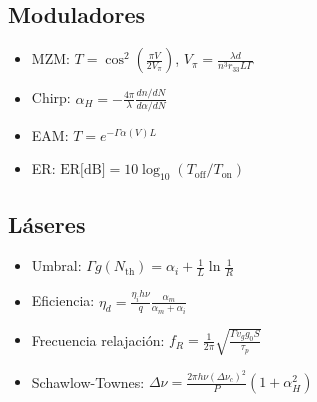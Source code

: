 \documentclass[11pt,a4paper]{article}
\begin{document}
\subsection{Moduladores}

\begin{itemize}
    \item MZM: $T = \cos^2\left(\frac{\pi V}{2V_\pi}\right)$, $V_\pi = \frac{\lambda d}{n^3r_{33}L\Gamma}$
    \item Chirp: $\alpha_H = -\frac{4\pi}{\lambda}\frac{dn/dN}{d\alpha/dN}$
    \item EAM: $T = e^{-\Gamma\alpha(V)L}$
    \item ER: $\text{ER[dB]} = 10\log_{10}(T_{\text{off}}/T_{\text{on}})$
\end{itemize}

\subsection{Láseres}

\begin{itemize}
    \item Umbral: $\Gamma g(N_{\text{th}}) = \alpha_i + \frac{1}{L}\ln\frac{1}{R}$
    \item Eficiencia: $\eta_d = \frac{\eta_i h\nu}{q}\frac{\alpha_m}{\alpha_m + \alpha_i}$
    \item Frecuencia relajación: $f_R = \frac{1}{2\pi}\sqrt{\frac{\Gamma v_g g_0 S}{\tau_p}}$
    \item Schawlow-Townes: $\Delta\nu = \frac{2\pi h\nu(\Delta\nu_c)^2}{P}(1+\alpha_H^2)$
\end{itemize}
\end{document}
